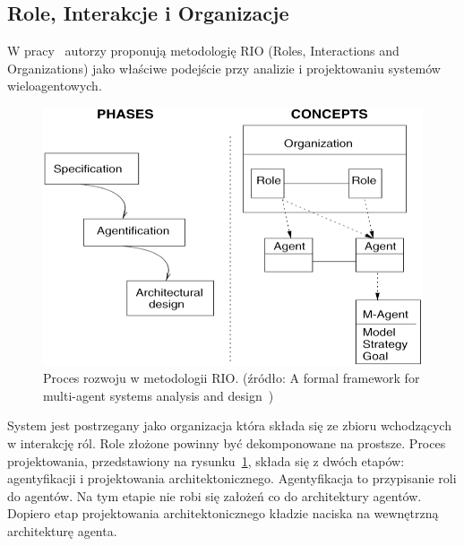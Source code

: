 \documentclass[11pt]{report}
\begin{document}
    \subsection{Role, Interakcje i Organizacje}
    W pracy~\cite{S095741740200070220020101} autorzy proponują metodologię RIO (Roles, Interactions and Organizations) jako właściwe podejście przy analizie i projektowaniu systemów wieloagentowych.
    \begin{figure}[!ht]
        \centering
        \includegraphics[width=\linewidth]{fig/RIO approach.png}
        \caption{Proces rozwoju w metodologii RIO. (źródło: A formal framework for multi-agent systems analysis and design~\cite{S095741740200070220020101})}
        \label{fig:rio}
    \end{figure}
    System jest postrzegany jako organizacja która składa się ze zbioru wchodzących w interakcję ról.
    Role złożone powinny być dekomponowane na prostsze.
    Proces projektowania, przedstawiony na rysunku~\ref{fig:rio}, składa się z dwóch etapów: agentyfikacji i projektowania architektonicznego.
    Agentyfikacja to przypisanie roli do agentów.
    Na tym etapie nie robi się założeń co do architektury agentów.
    Dopiero etap projektowania architektonicznego kładzie naciska na wewnętrzną architekturę agenta.
\end{document}
